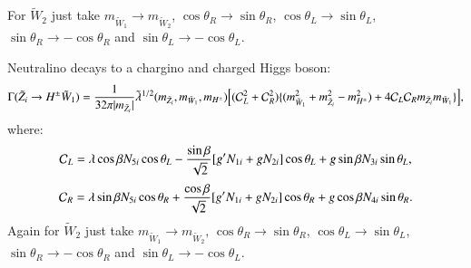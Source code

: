 \documentclass[final,3p,times,pdflatex]{elsarticle}
\begin{document}
For $\tilde{W}_2$ just take $m_{\tilde{W}_1} \rightarrow m_{\tilde{W}_2}$, $\cos\theta_R \rightarrow \sin\theta_R$,  $\cos\theta_L \rightarrow \sin\theta_L$, $\sin\theta_R \rightarrow -\cos\theta_R$ and $\sin\theta_L \rightarrow -\cos\theta_L$.

Neutralino decays to a chargino and charged Higgs boson:
\begin{equation} \label{neutHpmchNMSSM}
\Gamma(\tilde{Z}_i \rightarrow H^{\pm} \tilde{W}_{1}) = {1 \over 32\pi |m_{\tilde{Z}_i}|} \tilde{\lambda}^{1/2}(m_{\tilde{Z}_i},m_{\tilde{W}_1},m_{H^{\pm}})\Big[ (\mathcal{C}_{L}^2 + \mathcal{C}_{R}^2)\{(m_{\tilde{W}_1}^2 + m_{\tilde{Z}_i}^2 - m_{H^{\pm}}^2) + 4\mathcal{C}_{L} \mathcal{C}_{R} m_{\tilde{Z}_i} m_{\tilde{W}_1}\}\Big],
\end{equation}
where:
\begin{equation}
\mathcal{C}_{L} = \lambda\cos\beta N_{5i} \cos\theta_L  - {\sin\beta \over \sqrt{2}} [g' N_{1i} + gN_{2i}]\cos\theta_L + g\sin\beta N_{3i}\sin\theta_L,
\end{equation}
\begin{equation}
\mathcal{C}_{R} = \lambda\sin\beta N_{5i} \cos\theta_R  + {\cos\beta \over \sqrt{2}} [g' N_{1i} + gN_{2i}]\cos\theta_R + g\cos\beta N_{4i}\sin\theta_R.
\end{equation}
Again for $\tilde{W}_2$ just take $m_{\tilde{W}_1} \rightarrow m_{\tilde{W}_2}$, $\cos\theta_R \rightarrow \sin\theta_R$,  $\cos\theta_L \rightarrow \sin\theta_L$, $\sin\theta_R \rightarrow -\cos\theta_R$ and $\sin\theta_L \rightarrow -\cos\theta_L$.
\end{document}
